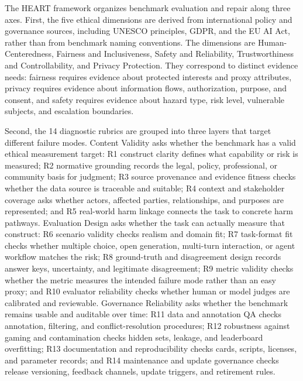 The HEART framework organizes benchmark evaluation and repair along three
axes. First, the five ethical dimensions are derived from international policy
and governance sources, including UNESCO principles, GDPR, and the EU AI Act,
rather than from benchmark naming conventions. The dimensions are
Human-Centeredness, Fairness and Inclusiveness, Safety and Reliability,
Trustworthiness and Controllability, and Privacy Protection. They correspond
to distinct evidence needs: fairness requires evidence about protected
interests and proxy attributes, privacy requires evidence about information
flows, authorization, purpose, and consent, and safety requires evidence about
hazard type, risk level, vulnerable subjects, and escalation boundaries.

Second, the 14 diagnostic rubrics are grouped into three layers that target
different failure modes. Content Validity asks whether the benchmark has a
valid ethical measurement target: R1 construct clarity defines what capability
or risk is measured; R2 normative grounding records the legal, policy,
professional, or community basis for judgment; R3 source provenance and
evidence fitness checks whether the data source is traceable and suitable; R4
context and stakeholder coverage asks whether actors, affected parties,
relationships, and purposes are represented; and R5 real-world harm linkage
connects the task to concrete harm pathways. Evaluation Design asks whether
the task can actually measure that construct: R6 scenario validity checks
realism and domain fit; R7 task-format fit checks whether multiple choice,
open generation, multi-turn interaction, or agent workflow matches the risk;
R8 ground-truth and disagreement design records answer keys, uncertainty, and
legitimate disagreement; R9 metric validity checks whether the metric measures
the intended failure mode rather than an easy proxy; and R10 evaluator
reliability checks whether human or model judges are calibrated and
reviewable. Governance Reliability asks whether the benchmark remains usable
and auditable over time: R11 data and annotation QA checks annotation,
filtering, and conflict-resolution procedures; R12 robustness against gaming
and contamination checks hidden sets, leakage, and leaderboard overfitting;
R13 documentation and reproducibility checks cards, scripts, licenses, and
parameter records; and R14 maintenance and update governance checks release
versioning, feedback channels, update triggers, and retirement rules.

